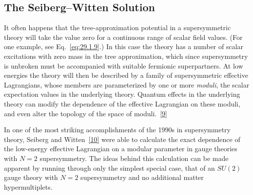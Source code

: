 
\subsection[The Seiberg--Witten Solution]{The Seiberg--Witten
Solution\footnotemark}

It often happens that the tree-approximation potential in a supersymmetric
theory will take the value zero for a continuous range of scalar field
values. (For one example, see Eq.~\eqref{eq:29.1.9}.) In this case the theory
has a number of scalar excitations with zero mass in the tree approximation,
which since supersymmetry is unbroken must be accompanied with suitable
fermionic superpartners. At low energies the theory will then be described by
a family of supersymmetric effective Lagrangians, whose members are
parameterized by one or more \textit{moduli}, the scalar expectation values
in the underlying theory. Quantum effects in the underlying theory can
modify the dependence of the effective Lagrangian on these moduli, and even
alter the topology of the space of moduli.~\hyperref[ch29-ref-9]{[9]}

In one of the most striking accomplishments of the 1990s in supersymmetry
theory, Seiberg and Witten~\hyperref[ch29-ref-10]{[10]} were able to
calculate the exact dependence of the low-energy effective Lagrangian on a
modular parameter in gauge theories with \(N=2\) supersymmetry. The ideas
behind this calculation can be made apparent by running through only the
simplest special case, that of an \(SU(2)\) gauge theory with \(N=2\)
supersymmetry and no additional matter hypermultiplets.

